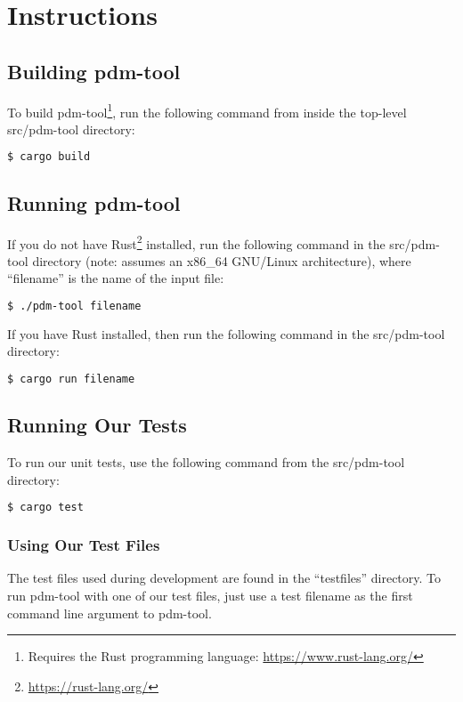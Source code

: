 \chapter{Instructions}

\section{Building pdm-tool}

To build pdm-tool\footnote{Requires the Rust programming language:
\url{https://www.rust-lang.org/}}, run the following command from inside the
top-level src/pdm-tool directory:

\begin{lstlisting}[language=bash,frame=single,showstringspaces=false]
$ cargo build
\end{lstlisting}

\section{Running pdm-tool}

If you do not have Rust\footnote{\url{https://rust-lang.org/}} installed,
run the following command in the
src/pdm-tool directory (note: assumes an x86\_64 GNU/Linux architecture), where
``filename'' is the name of the input file:

\begin{lstlisting}[language=bash,frame=single,showstringspaces=false]
$ ./pdm-tool filename
\end{lstlisting}

If you have Rust installed, then run the following command in the src/pdm-tool
directory:

\begin{lstlisting}[language=bash,frame=single,showstringspaces=false]
$ cargo run filename
\end{lstlisting}

\section{Running Our Tests}

To run our unit tests, use the following command from the src/pdm-tool
directory:

\begin{lstlisting}[language=bash,frame=single,showstringspaces=false]
$ cargo test
\end{lstlisting}

\subsection{Using Our Test Files}

The test files used during development are found in the ``testfiles''
directory. To run pdm-tool with one of our test files, just use a
test filename as the first command line argument to pdm-tool.
